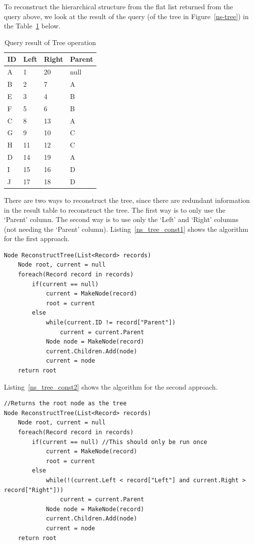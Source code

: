 To reconstruct the hierarchical structure from the flat list returned from the query above, we look at the result of the query (of the tree in Figure~\ref{ns-tree}) in the Table~\ref{table:ns_tree} below.

\begin{table}[h]
\centering
\begin{tabular}{|l|l|l|l|}
\hline
{\bf ID} & {\bf Left} & {\bf Right} & {\bf Parent} \\ \hline\hline
A & 1 & 20 & null \\ \hline
B & 2 & 7 & A \\ \hline
E & 3 & 4 & B \\ \hline
F & 5 & 6 & B \\ \hline
C & 8 & 13 & A \\ \hline
G & 9 & 10 & C \\ \hline
H & 11 & 12	& C \\ \hline
D & 14 & 19	& A \\ \hline
I & 15 & 16	& D \\ \hline
J & 17 & 18	& D \\ \hline
\end{tabular}
\caption{Query result of Tree operation\label{table:ns_tree}}
\end{table}

There are two ways to reconstruct the tree, since there are redundant information in the result table to reconstruct the tree. The first way is to only use the `Parent' column. The second way is to use only the `Left' and `Right' columns (not needing the `Parent' column). Listing~\ref{ns_tree_const1} shows the algorithm for the first approach.

\begin{minipage}{\linewidth}
\begin{lstlisting}[frame=single]
Node ReconstructTree(List<Record> records)
	Node root, current = null
	foreach(Record record in records)
		if(current == null)
			current = MakeNode(record)
			root = current
		else
			while(current.ID != record["Parent"])
				current = current.Parent
			Node node = MakeNode(record)
			current.Children.Add(node)
			current = node
	return root
\end{lstlisting}	
\end{minipage}

Listing~\ref{ns_tree_const2} shows the algorithm for the second approach.

\begin{minipage}{\linewidth}
\begin{lstlisting}[frame=single]
//Returns the root node as the tree
Node ReconstructTree(List<Record> records)
	Node root, current = null
	foreach(Record record in records)
		if(current == null) //This should only be run once
			current = MakeNode(record)
			root = current
		else
			while(!(current.Left < record["Left"] and current.Right > record["Right"]))
				current = current.Parent
			Node node = MakeNode(record)
			current.Children.Add(node)
			current = node
	return root
\end{lstlisting}	
\end{minipage}
